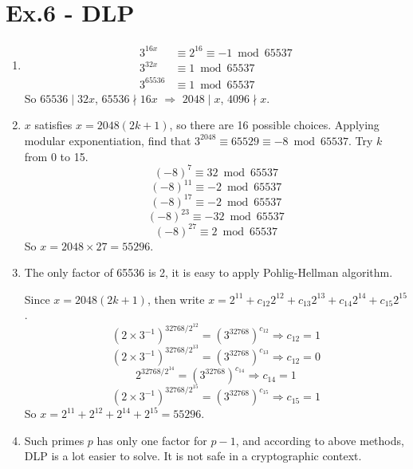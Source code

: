 \documentclass[12pt]{article}
\begin{document}
\section*{Ex.6 - DLP}

	\begin{enumerate}
		\item
			\begin{align*}
				3^{16x}&\equiv2^{16}\equiv-1\bmod65537\\
				3^{32x}&\equiv1\bmod65537\\
				3^{65536}&\equiv1\bmod65537
			\end{align*}
			So $65536\mid 32x$, $65536\nmid 16x$ $\Rightarrow$ $2048\mid x$, $4096\nmid x$.
		\item
			$x$ satisfies $x=2048(2k+1)$, so there are 16 possible choices. Applying modular exponentiation, find that $3^{2048}\equiv65529\equiv-8\bmod65537$. Try $k$ from 0 to 15.
			$$(-8)^7\equiv32\bmod65537$$
			$$(-8)^11\equiv-2\bmod65537$$
			$$(-8)^17\equiv-2\bmod65537$$
			$$(-8)^23\equiv-32\bmod65537$$
			$$(-8)^27\equiv2\bmod65537$$
			So $x=2048\times27=55296$.
		\item
			The only factor of 65536 is 2, it is easy to apply Pohlig-Hellman algorithm.

			Since $x=2048(2k+1)$, then write $x=2^{11}+c_{12}2^{12}+c_{13}2^{13}+c_{14}2^{14}+c_{15}2^{15}$.
			$$(2\times3^{-1})^{32768/2^{12}}=(3^{32768})^{c_{12}}\Rightarrow c_{12}=1$$
			$$(2\times3^{-1})^{32768/2^{13}}=(3^{32768})^{c_{13}}\Rightarrow c_{12}=0$$
			$$2^{32768/2^{14}}=(3^{32768})^{c_{14}}\Rightarrow c_{14}=1$$
			$$(2\times3^{-1})^{32768/2^{15}}=(3^{32768})^{c_{15}}\Rightarrow c_{15}=1$$
			So $x=2^{11}+2^{12}+2^{14}+2^{15}=55296$.
		\item
			Such primes $p$ has only one factor for $p-1$, and according to above methods, DLP is a lot easier to solve. It is not safe in a cryptographic context.
	\end{enumerate}
\end{document}
